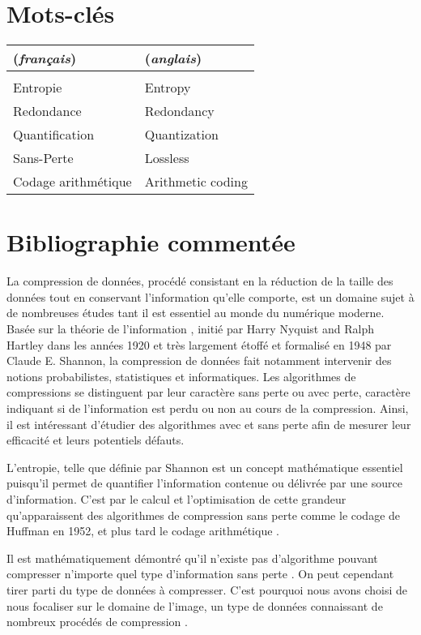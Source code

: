 \documentclass[a4paper, 11pt]{article}
\begin{document}
\section*{Mots-cl\'es}

\begin{tabular}{l l} 
    (\textit{français}) & (\textit{anglais}) \\ \hline
     & \\
    Entropie & Entropy \\
    Redondance & Redondancy \\
    Quantification & Quantization \\
    Sans-Perte & Lossless \\
    Codage arithmétique & Arithmetic coding \\
    \end{tabular}

\section*{Bibliographie comment\'ee}

La compression de données, procédé consistant en la réduction de la taille des données tout en conservant l'information qu'elle comporte, est un domaine sujet à de nombreuses études tant il est essentiel au monde du numérique moderne. Basée sur la théorie de l'information \cite{entropy}, initié par Harry Nyquist and Ralph Hartley dans les ann\'ees 1920 et très largement étoffé et formalisé en 1948 par Claude E. Shannon, la compression de données fait notamment intervenir des notions probabilistes, statistiques et informatiques. Les algorithmes de compressions se distinguent par leur caractère sans perte ou avec perte, caractère indiquant si de l'information est perdu ou non au cours de la compression. Ainsi, il est intéressant d'étudier des algorithmes avec et sans perte afin de mesurer leur efficacité et leurs potentiels défauts.

L'entropie, telle que définie par Shannon \cite{entropy} est un concept mathématique essentiel puisqu'il permet de quantifier l'information contenue ou délivrée par une source d'information. C'est par le calcul et l'optimisation de cette grandeur qu'apparaissent des algorithmes de compression sans perte comme le codage de Huffman \cite{huffman} en 1952, et plus tard le codage arithmétique \cite{arithmetic-coding}.

Il est mathématiquement démontré qu'il n'existe pas d'algorithme pouvant compresser n'importe quel type d'information sans perte \cite{compression}. On peut cependant tirer parti du type de données à compresser. C'est pourquoi nous avons choisi de nous focaliser sur le domaine de l'image, un type de données connaissant de nombreux procédés de compression \cite{compression} \cite{code-theory}.
\end{document}
